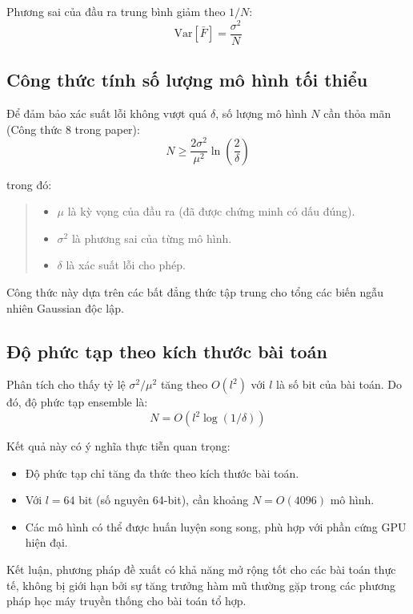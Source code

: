 Phương sai của đầu ra trung bình giảm theo $1/N$:
\begin{equation}
    \text{Var}[\bar{F}] = \frac{\sigma^2}{N}
\end{equation}

\subsection{Công thức tính số lượng mô hình tối thiểu}

Để đảm bảo xác suất lỗi không vượt quá $\delta$, số lượng mô hình $N$ cần thỏa mãn (Công thức 8 trong paper):
\begin{equation}
    N \geq \frac{2\sigma^2}{\mu^2} \ln\left(\frac{2}{\delta}\right)
\end{equation}

trong đó:
\begin{quote}
\begin{itemize}
    \item $\mu$ là kỳ vọng của đầu ra (đã được chứng minh có dấu đúng).
    \item $\sigma^2$ là phương sai của từng mô hình.
    \item $\delta$ là xác suất lỗi cho phép.
\end{itemize}
\end{quote}

Công thức này dựa trên các bất đẳng thức tập trung cho tổng các biến ngẫu nhiên Gaussian độc lập.

\subsection{Độ phức tạp theo kích thước bài toán}

Phân tích cho thấy tỷ lệ $\sigma^2/\mu^2$ tăng theo $O(l^2)$ với $l$ là số bit của bài toán. Do đó, độ phức tạp ensemble là:
\begin{equation}
    N = O(l^2 \log(1/\delta))
\end{equation}

Kết quả này có ý nghĩa thực tiễn quan trọng:
\begin{itemize}
    \item Độ phức tạp chỉ tăng đa thức theo kích thước bài toán.
    \item Với $l = 64$ bit (số nguyên 64-bit), cần khoảng $N = O(4096)$ mô hình.
    \item Các mô hình có thể được huấn luyện song song, phù hợp với phần cứng GPU hiện đại.
\end{itemize}

Kết luận, phương pháp đề xuất có khả năng mở rộng tốt cho các bài toán thực tế, không bị giới hạn bởi sự tăng trưởng hàm mũ thường gặp trong các phương pháp học máy truyền thống cho bài toán tổ hợp.
